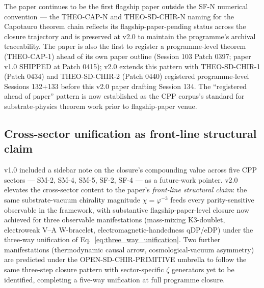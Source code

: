 \documentclass[11pt,letterpaper]{article}
\newcommand{\phig}{\varphi}
\begin{document}
The paper continues to be the first flagship paper outside the SF-N numerical convention --- the THEO-CAP-N and THEO-SD-CHIR-N naming for the Capotauro theorem chain reflects its flagship-paper-pending status across the closure trajectory and is preserved at v2.0 to maintain the programme's archival traceability. The paper is also the first to register a programme-level theorem (THEO-CAP-1) ahead of its own paper outline (Session 103 Patch 0397; paper v1.0 SHIPPED at Patch 0415); v2.0 extends this pattern with THEO-SD-CHIR-1 (Patch 0434) and THEO-SD-CHIR-2 (Patch 0440) registered programme-level Sessions 132+133 before this v2.0 paper drafting Session 134. The ``registered ahead of paper'' pattern is now established as the CPP corpus's standard for substrate-physics theorem work prior to flagship-paper venue.

\subsection{Cross-sector unification as front-line structural claim}\label{sec:cross_sector}

v1.0 included a sidebar note on the closure's compounding value across five CPP sectors --- SM-2, SM-4, SM-5, SF-2, SF-4 --- as a future-work pointer. v2.0 elevates the cross-sector content to the paper's \emph{front-line structural claim}: the same substrate-vacuum chirality magnitude $\chi = \phig^{-3}$ feeds every parity-sensitive observable in the framework, with substantive flagship-paper-level closure now achieved for three observable manifestations (mass-mixing K3-doublet, electroweak V--A W-bracelet, electromagnetic-handedness qDP/eDP) under the three-way unification of Eq.~\eqref{eq:three_way_unification}. Two further manifestations (thermodynamic causal arrow, cosmological-vacuum asymmetry) are predicted under the OPEN-SD-CHIR-PRIMITIVE umbrella to follow the same three-step closure pattern with sector-specific $\zeta$ generators yet to be identified, completing a five-way unification at full programme closure.
\end{document}
